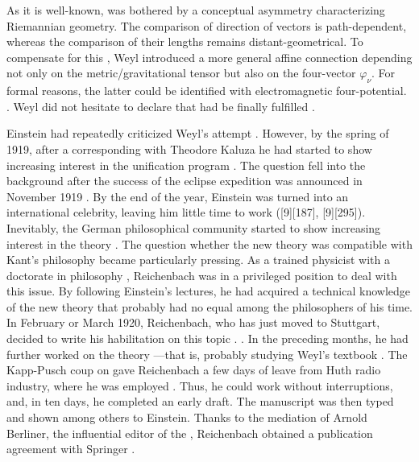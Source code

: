 \documentclass[draft]{article}
\newcommand{\phin}{\ensuremath{\varphi_\nu}\xspace}
\begin{document}
As it is well-known, \citet{Weyl1918a,Weyl1919a} was bothered by a conceptual asymmetry characterizing Riemannian geometry. The comparison of direction of vectors is path-dependent, whereas the comparison of their lengths remains distant-geometrical. To compensate for this   \citep{Afriat2009}, Weyl introduced a more general affine connection depending not only on the metric/gravitational tensor \gmn but also on the four-vector \phin. For formal reasons, the latter could be identified with electromagnetic four-potential. . Weyl did not hesitate to declare that  had be finally fulfilled \citep[263]{Weyl1919}.

Einstein had repeatedly criticized Weyl's attempt \citep{Einstein1918b}. However, by the spring of 1919, after a corresponding with Theodore Kaluza he had started to show increasing interest in the unification program \citep{Wuensch2005}. The question fell into the background after the success of the eclipse expedition was announced in November 1919 \citep{Dyson1920}. By the end of the year, Einstein was turned into an international celebrity, leaving him little time to work ([9][187], [9][295]). Inevitably, the German philosophical community started to show increasing interest in the theory \citep[see][for an overview]{Hentschel1990a}. The question whether the new theory was compatible with Kant's philosophy became particularly pressing. As a trained physicist with a doctorate in philosophy \cite{Reichenbach1916}, Reichenbach was in a privileged position to deal with this issue. By following Einstein's lectures, he had acquired a technical knowledge of the new theory that probably had no equal among the philosophers of his time. In February or March 1920, Reichenbach, who has just moved to Stuttgart, decided to write his habilitation on this topic . . In the preceding months, he had further worked on the theory  \citep[044-06-23]{HR}---that is, probably studying Weyl's textbook  \citep{Weyl1918}. The Kapp-Pusch coup on  gave Reichenbach a few days of leave from Huth radio industry, where he was employed \citep[044-06-23]{HR}. Thus, he could work without interruptions, and, in ten days, he completed an early draft. The manuscript was then typed and shown among others to Einstein. Thanks to the mediation of Arnold Berliner, the influential editor of the , Reichenbach obtained a publication agreement with Springer \citep[044-06-23]{HR}.
\end{document}
